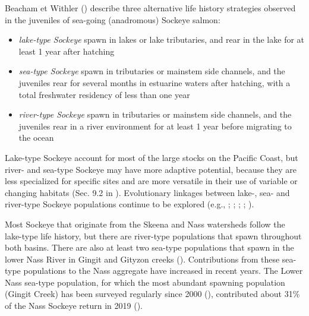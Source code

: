 \documentclass[french,11pt]{book}
\begin{document}
Beacham et Withler () describe three alternative life history strategies observed in the juveniles of sea-going (anadromous) Sockeye salmon:
\begin{itemize}

\item
  \emph{lake-type Sockeye} spawn in lakes or lake tributaries, and rear in the lake for at least 1 year after hatching
\item
  \emph{sea-type Sockeye} spawn in tributaries or mainstem side channels, and the juveniles rear for several months in estuarine waters after hatching, with a total freshwater residency of less than one year
\item
  \emph{river-type Sockeye} spawn in tributaries or mainstem side channels, and the juveniles rear in a river environment for at least 1 year before migrating to the ocean
\end{itemize}
Lake-type Sockeye account for most of the large stocks on the Pacific Coast, but river- and sea-type Sockeye may have more adaptive potential, because they are less specialized for specific sites and are more versatile in their use of variable or changing habitats (Sec. 9.2 in ). Evolutionary linkages between lake-, sea- and river-type Sockeye populations continue to be explored (e.g., ; ; ; ; ).

Most Sockeye that originate from the Skeena and Nass watersheds follow the lake-type life history, but there are river-type populations that spawn throughout both basins. There are also at least two sea-type populations that spawn in the lower Nass River in Gingit and Gityzon creeks (). Contributions from these sea-type populations to the Nass aggregate have increased in recent years. The Lower Nass sea-type population, for which the most abundant spawning population (Gingit Creek) has been surveyed regularly since 2000 (), contributed about 31\% of the Nass Sockeye return in 2019 ().
\end{document}
